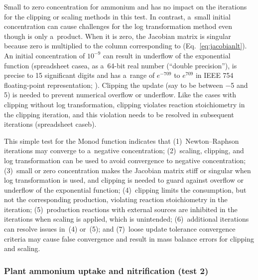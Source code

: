 \documentclass[gmd,noline]{copernicus}
\begin{document}
      Small to zero concentration for ammonium and  has no
      impact on the iterations for the clipping or scaling methods in this
      test. In contrast, a~small initial  concentration can
      cause challenges for the log transformation method even though
       is only a~product. When it is zero, the Jacobian matrix
      is singular because zero is multiplied to the column corresponding to
       (Eq.~\ref{eq:jacobianlt}). An initial 
      concentration of $10^{-9}$ can result in underflow of the exponential
      function (spreadsheet casea, as a~64-bit real number (``double
      precision''), is precise to 15 significant digits and has a~range of
      $e^{-709}$ to $e^{709}$ in IEEE 754 floating-point representation;
      \citealp{Lemmon2005}).  Clipping the update (say to be between $-$5 and
      5) is needed to prevent numerical overflow or underflow. Like the
      cases with clipping without log transformation, clipping violates
      reaction stoichiometry in the clipping iteration, and this violation
      needs to be resolved in subsequent iterations (spreadsheet caseb).

      This simple test for the Monod function indicates that
      (1)~Newton--Raphson iterations may converge to a~negative
      concentration; (2)~scaling, clipping, and log transformation can be
      used to avoid convergence to negative concentration; (3)~small or zero
      concentration makes the Jacobian matrix stiff or singular when log
      transformation is used, and clipping is needed to guard against
      overflow or underflow of the exponential function; (4)~clipping limits
      the consumption, but not the corresponding production, violating
      reaction stoichiometry in the iteration; (5)~production reactions with
      external sources are inhibited in the iterations when scaling is
      applied, which is unintended; (6)~additional iterations can resolve
      issues in~(4) or~(5); and (7)~loose update tolerance convergence
      criteria may cause false convergence and result in mass balance errors
      for clipping and scaling.



\subsubsection*{Plant ammonium uptake and nitrification (test 2)}
\end{document}
